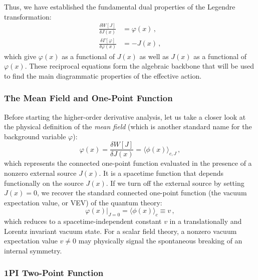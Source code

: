 Thus, we have established the fundamental dual properties of the Legendre transformation:
\begin{equation} \label{eq:basic_legendre_properties}
    \begin{aligned}
        \frac{\delta W[J]}{\delta J(x)}                  & = \varphi(x) \, , \\
        \frac{\delta \Gamma[\varphi]}{\delta \varphi(x)} & = -J(x) \, ,
    \end{aligned}
\end{equation}
which give \(\varphi(x)\) as a functional of \(J(x)\) as well as \(J(x)\) as a functional of \(\varphi(x)\). These reciprocal equations form the algebraic backbone that will be used to find the main diagrammatic properties of the effective action.

\subsubsection{The Mean Field and One-Point Function}

Before starting the higher-order derivative analysis, let us take a closer look at the physical definition of the \textit{mean field} (which is another standard name for the background variable \(\varphi\)):
\begin{equation} \label{eq:mean_field_def}
    \varphi(x) = \frac{\delta W[J]}{\delta J(x)} = \langle \phi(x) \rangle_{c, J} \, ,
\end{equation}
which represents the connected one-point function evaluated in the presence of a nonzero external source \(J(x)\). It is a spacetime function that depends functionally on the source \(J(x)\). If we turn off the external source by setting \(J(x) = 0\), we recover the standard connected one-point function (the vacuum expectation value, or VEV) of the quantum theory:
\begin{equation} \label{eq:vev_definition}
    \left. \varphi(x) \right|_{J=0} = \langle \phi(x) \rangle_c \equiv v \, ,
\end{equation}
which reduces to a spacetime-independent constant \(v\) in a translationally and Lorentz invariant vacuum state. For a scalar field theory, a nonzero vacuum expectation value \(v \neq 0\) may physically signal the spontaneous breaking of an internal symmetry.

\subsubsection{1PI Two-Point Function}

